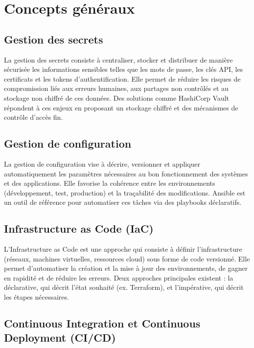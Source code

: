 \section{Concepts généraux}

\subsection{Gestion des secrets}

La gestion des secrets consiste à centraliser, stocker et distribuer de manière sécurisée les informations sensibles telles que les mots de passe, les clés API, les certificats et les tokens d’authentification. Elle permet de réduire les risques de compromission liés aux erreurs humaines, aux partages non contrôlés et au stockage non chiffré de ces données. Des solutions comme HashiCorp Vault répondent à ces enjeux en proposant un stockage chiffré et des mécanismes de contrôle d’accès fin.

\subsection{Gestion de configuration}

La gestion de configuration vise à décrire, versionner et appliquer automatiquement les paramètres nécessaires au bon fonctionnement des systèmes et des applications. Elle favorise la cohérence entre les environnements (développement, test, production) et la traçabilité des modifications. Ansible est un outil de référence pour automatiser ces tâches via des playbooks déclaratifs.

\subsection{Infrastructure as Code (IaC)}

L’Infrastructure as Code est une approche qui consiste à définir l’infrastructure (réseaux, machines virtuelles, ressources cloud) sous forme de code versionné. Elle permet d’automatiser la création et la mise à jour des environnements, de gagner en rapidité et de réduire les erreurs. Deux approches principales existent : la déclarative, qui décrit l’état souhaité (ex. Terraform), et l’impérative, qui décrit les étapes nécessaires.

\subsection{Continuous Integration et Continuous Deployment (CI/CD)}

